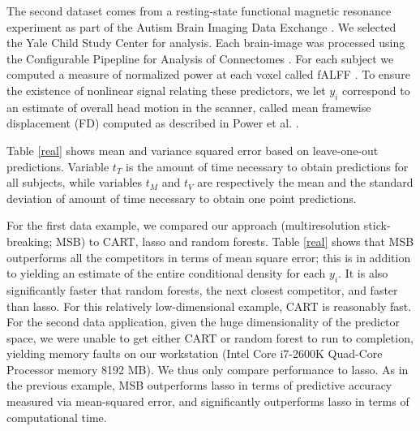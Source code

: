 \documentclass{article} %
\begin{document}
The second dataset comes from a resting-state functional magnetic resonance experiment as part of the Autism Brain Imaging Data Exchange \cite{Autism}.  We selected the Yale Child Study Center for analysis.  Each brain-image was processed using the Configurable Pipepline for Analysis of Connectomes \cite{cpac}. For each subject we computed a measure of normalized power at each voxel called fALFF \cite{Zou2008}.  To ensure the existence of nonlinear signal relating these predictors, we let $y_i$ correspond to an estimate of overall head motion in the scanner, called mean framewise displacement (FD) computed as described in Power et al. \cite{power}. 

Table \ref{real} shows mean and variance squared error based on leave-one-out predictions. Variable $t_{T}$ is the amount of time necessary to obtain predictions for all subjects, while variables $t_M$ and $t_V$ are respectively the mean and the standard deviation of amount of time necessary to obtain one point predictions.

For the first data example, we compared our approach (multiresolution stick-breaking; MSB) to CART, lasso and random forests. 
Table \ref{real} shows that MSB outperforms all the competitors in terms of mean square error; this is in addition to yielding an estimate of the entire conditional density for each $y_i$.  It is also significantly faster that random forests, the next closest competitor, and faster than lasso.  For this relatively low-dimensional example, CART is reasonably fast.   For the second data application, given the huge dimensionality of the predictor space, we were unable to get either CART or random forest to run to completion, yielding memory faults on our workstation (Intel Core i7-2600K Quad-Core Processor memory 8192 MB).  We thus only compare performance to lasso.  As in the previous example, MSB outperforms lasso in terms of predictive accuracy measured via mean-squared error, and significantly outperforms lasso in terms of computational time.  
\end{document}
